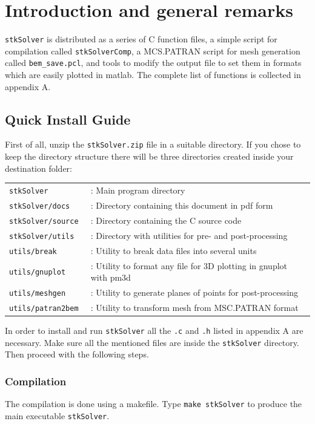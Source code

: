 \documentclass[12pt]{article}
\begin{document}
\tableofcontents
\pagebreak

\section{Introduction and general remarks}
\verb+stkSolver+ is distributed as a series of C function files, a simple script for compilation called \verb+stkSolverComp+, a MCS.PATRAN script for mesh generation called \verb+bem_save.pcl+, and tools to modify the output file to set them in formats which are easily plotted in matlab. The complete list of functions is collected in appendix A.

\subsection{Quick Install Guide}
First of all, unzip the \verb+stkSolver.zip+ file in a suitable directory. If you chose to keep the directory structure there will be three directories created inside your destination folder:

\begin{tabular}{ll}
\texttt{stkSolver}&: Main program directory\\
\texttt{stkSolver/docs}&: Directory containing this document in pdf form\\
\texttt{stkSolver/source}&: Directory containing the C source code\\
\texttt{stkSolver/utils}&: Directory with utilities for pre- and post-processing\\
\texttt{utils/break}&: Utility to break data files into several units\\
\texttt{utils/gnuplot}&: Utility to format any file for 3D plotting in gnuplot with pm3d\\
\texttt{utils/meshgen}&: Utility to generate planes of points for post-processing\\
\texttt{utils/patran2bem }&: Utility to transform mesh from MSC.PATRAN format\\
\end{tabular}

In order to install and run \verb+stkSolver+ all the \verb+.c+ and \verb+.h+ listed in appendix A are necessary. Make sure all the mentioned files are inside the \verb+stkSolver+ directory. Then proceed with the following steps.

\subsubsection*{Compilation}
The compilation is done using a makefile. Type \verb+make stkSolver+ to produce the main executable \verb+stkSolver+.
\end{document}
